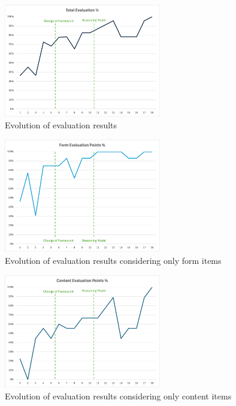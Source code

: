 \documentclass[a4paper]{report}
\begin{document}
\begin{figure}[H]
\centering
\includegraphics[width=0.61\textwidth]{images/evals-total.png}
\caption{Evolution of evaluation results}
\label{fig:evals-total}
\end{figure}

\begin{figure}[H]
\centering
\includegraphics[width=0.61\textwidth]{images/evals-form.png}
\caption{Evolution of evaluation results considering only form items}
\label{fig:evals-form}
\end{figure}

\begin{figure}[H]
\centering
\includegraphics[width=0.61\textwidth]{images/evals-content.png}
\caption{Evolution of evaluation results considering only content items}
\label{fig:evals-content}
\end{figure}
\end{document}
